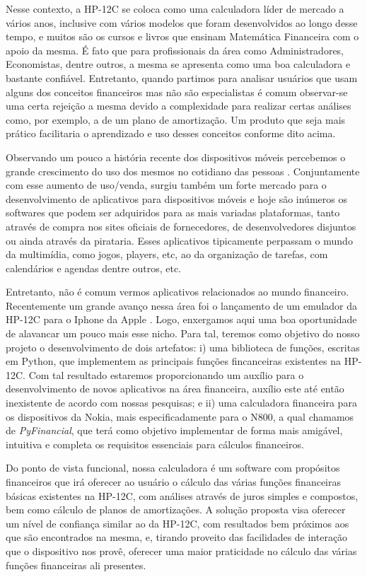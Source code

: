 Nesse contexto, a HP-12C \cite{hp12c} se coloca como uma calculadora líder de mercado a vários anos, inclusive com vários modelos que foram desenvolvidos ao longo desse tempo, e muitos são os cursos e livros que ensinam Matemática Financeira com o apoio da mesma. É fato que para profissionais da área como Administradores, Economistas, dentre outros, a mesma se apresenta como uma boa calculadora e bastante confiável. Entretanto, quando partimos para analisar usuários que usam alguns dos conceitos financeiros mas não são especialistas é comum observar-se uma certa rejeição a mesma devido a complexidade para realizar certas análises como, por exemplo, a de um plano de amortização. Um produto que seja mais prático facilitaria o aprendizado e uso desses conceitos conforme dito acima.

Observando um pouco a história recente dos dispositivos móveis percebemos o grande crescimento do uso dos mesmos no cotidiano das pessoas \cite{celular}. Conjuntamente com esse aumento de uso/venda, surgiu também um forte mercado para o desenvolvimento de aplicativos para dispositivos móveis e hoje são inúmeros os softwares que podem ser adquiridos para as mais variadas plataformas, tanto através de compra nos sites oficiais de fornecedores, de desenvolvedores disjuntos ou ainda através da pirataria. Esses aplicativos tipicamente perpassam o mundo da multimídia, como jogos, players, etc, ao da organização de tarefas, com calendários e agendas dentre outros, etc.

Entretanto, não é comum vermos aplicativos relacionados ao mundo financeiro. Recentemente um grande avanço nessa área foi o lançamento de um emulador da HP-12C para o Iphone da Apple \cite{iphone}. Logo, enxergamos aqui uma boa oportunidade de alavancar um pouco mais esse nicho. Para tal, teremos como objetivo do nosso projeto o desenvolvimento de dois artefatos: i) uma biblioteca de funções, escritas em Python, que implementem as principais funções fincanceiras existentes na HP-12C. Com tal resultado estaremos proporcionando um auxílio para o desenvolvimento de novos aplicativos na área financeira, auxílio este até então inexistente de acordo com nossas pesquisas; e ii) uma calculadora financeira para os dispositivos da Nokia, mais especificadamente para o N800, a qual chamamos de \textit{PyFinancial}, que terá como objetivo implementar de forma mais amigável, intuitiva e completa os requisitos essenciais para cálculos financeiros. 

Do ponto de vista funcional, nossa calculadora é um software com propósitos financeiros que irá oferecer ao usuário o cálculo das várias funções financeiras básicas existentes na HP-12C, com análises através de juros simples e compostos, bem como cálculo de planos de amortizações.  A solução proposta visa oferecer um nível de confiança similar ao da HP-12C, com resultados bem próximos aos que são encontrados na mesma, e, tirando proveito das facilidades de interação que o dispositivo nos provê, oferecer uma maior praticidade no cálculo das várias funções financeiras ali presentes.



